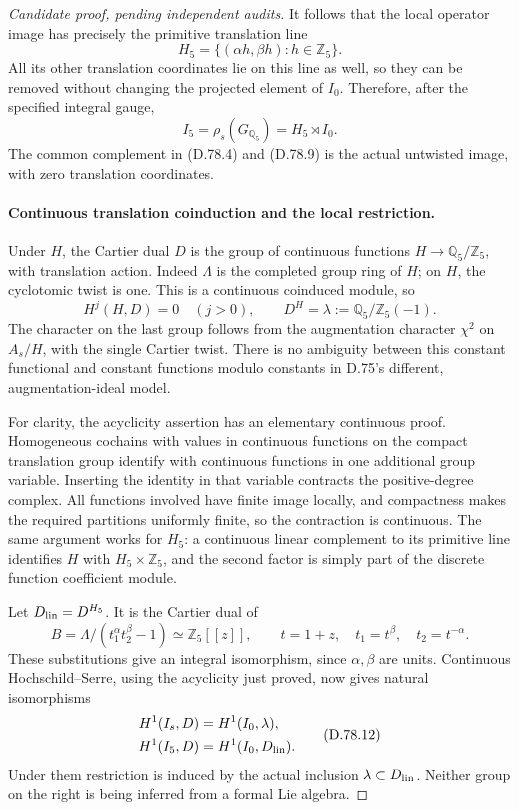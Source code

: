 \begin{proof}[Candidate proof, pending independent audits]
It follows that the local operator image has precisely the
primitive translation line
\[
 H_5=\{(\alpha h,\beta h):h\in\mathbb Z_5\}.
 \]
All its other translation coordinates lie on this line as
well, so they can be removed without changing the projected
element of \(I_0\). Therefore, after the specified integral gauge,
\[
                  I_5=\rho_s(G_{\mathbb Q_5})
                            =H_5\rtimes I_0.            \tag{D.78.9}
\]
The common complement in (D.78.4) and (D.78.9) is the actual
untwisted image, with zero translation coordinates.

\paragraph{Continuous translation coinduction and the local restriction.}
Under \(H\), the Cartier dual \(D\) is the group of continuous
functions \(H\to\mathbb Q_5/\mathbb Z_5\), with translation
action. Indeed \(\Lambda\) is the completed group ring of
\(H\); on \(H\), the cyclotomic twist is one. This is a
continuous coinduced module, so
\[
 H^j(H,D)=0\quad(j>0),\qquad
 D^H=\lambda:=\mathbb Q_5/\mathbb Z_5(-1).               \tag{D.78.10}
\]
The character on the last group follows from the augmentation
character \(\chi^2\) on \(A_s/H\), with the single Cartier
twist. There is no ambiguity between this constant functional
and constant functions modulo constants in D.75's different,
augmentation-ideal model.

For clarity, the acyclicity assertion has an elementary
continuous proof. Homogeneous cochains with values in
continuous functions on the compact translation group identify
with continuous functions in one additional group variable.
Inserting the identity in that variable contracts the
positive-degree complex. All functions involved have finite
image locally, and compactness makes the required partitions
uniformly finite, so the contraction is continuous.
The same argument works for \(H_5\): a continuous linear
complement to its primitive line identifies \(H\) with
\(H_5\times\mathbb Z_5\), and the second factor is simply
part of the discrete function coefficient module.

Let \(D_{\rm lin}=D^{H_5}\). It is the Cartier dual of
\[
 B=\Lambda/(t_1^\alpha t_2^\beta-1)
                \simeq\mathbb Z_5[[z]],\qquad t=1+z,
 \quad t_1=t^\beta,\quad t_2=t^{-\alpha}.
                                                               \tag{D.78.11}
\]
These substitutions give an integral isomorphism, since
\(\alpha,\beta\) are units. Continuous Hochschild--Serre,
using the acyclicity just proved, now gives natural isomorphisms
\[
 \begin{split}
 H^1(I_s,D)&=H^1(I_0,\lambda),\\
 H^1(I_5,D)&=H^1(I_0,D_{\rm lin}).
 \end{split}                                               \tag{D.78.12}
\]
Under them restriction is induced by the actual inclusion
\(\lambda\subset D_{\rm lin}\). Neither group on the right
is being inferred from a formal Lie algebra.


\end{proof}

